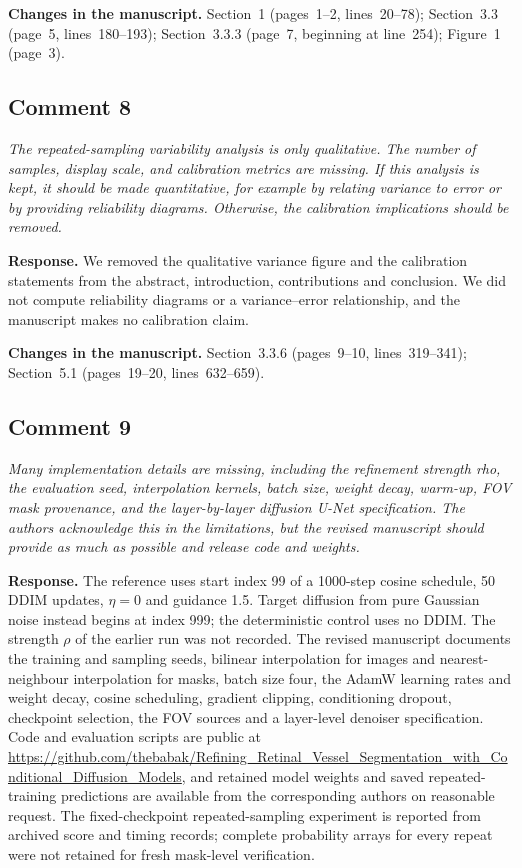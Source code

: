 \documentclass[11pt,a4paper]{article}
\newenvironment{revcomment}{\par\medskip\noindent\begin{minipage}{\linewidth}\itshape}{\end{minipage}\par\smallskip}
\begin{document}
\textbf{Changes in the manuscript.} Section~1 (pages~1--2, lines~20--78); Section~3.3 (page~5, lines~180--193); Section~3.3.3 (page~7, beginning at line~254); Figure~1 (page~3).

\subsection*{Comment 8}
\begin{revcomment}The repeated-sampling variability analysis is only qualitative. The number of samples, display scale, and calibration metrics are missing. If this analysis is kept, it should be made quantitative, for example by relating variance to error or by providing reliability diagrams. Otherwise, the calibration implications should be removed.\end{revcomment}
\textbf{Response.} We removed the qualitative variance figure and the calibration statements from the abstract, introduction, contributions and conclusion. We did not compute reliability diagrams or a variance--error relationship, and the manuscript makes no calibration claim.

\textbf{Changes in the manuscript.} Section~3.3.6 (pages~9--10, lines~319--341); Section~5.1 (pages~19--20, lines~632--659).

\subsection*{Comment 9}
\begin{revcomment}Many implementation details are missing, including the refinement strength rho, the evaluation seed, interpolation kernels, batch size, weight decay, warm-up, FOV mask provenance, and the layer-by-layer diffusion U-Net specification. The authors acknowledge this in the limitations, but the revised manuscript should provide as much as possible and release code and weights.\end{revcomment}
\textbf{Response.} The reference uses start index 99 of a 1000-step cosine schedule, 50 DDIM updates, $\eta=0$ and guidance 1.5. Target diffusion from pure Gaussian noise instead begins at index 999; the deterministic control uses no DDIM. The strength $\rho$ of the earlier run was not recorded. The revised manuscript documents the training and sampling seeds, bilinear interpolation for images and nearest-neighbour interpolation for masks, batch size four, the AdamW learning rates and weight decay, cosine scheduling, gradient clipping, conditioning dropout, checkpoint selection, the FOV sources and a layer-level denoiser specification. Code and evaluation scripts are public at \url{https://github.com/thebabak/Refining_Retinal_Vessel_Segmentation_with_Conditional_Diffusion_Models}, and retained model weights and saved repeated-training predictions are available from the corresponding authors on reasonable request. The fixed-checkpoint repeated-sampling experiment is reported from archived score and timing records; complete probability arrays for every repeat were not retained for fresh mask-level verification.
\end{document}
